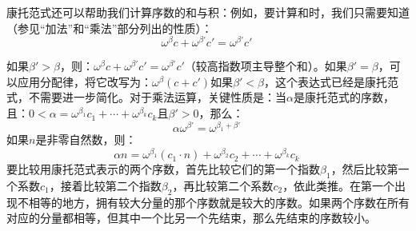康托范式还可以帮助我们计算序数的和与积：例如，要计算和时，我们只需要知道（参见“加法”和“乘法”部分列出的性质）：  
\[
\omega^\beta c + \omega^{\beta'} c' = \omega^{\beta'} c'~
\]

如果\(\beta' > \beta\)，则：\(\omega^\beta c + \omega^{\beta'} c' = \omega^{\beta'} c'\)（较高指数项主导整个和）。如果\(\beta' = \beta\)，可以应用分配律，将它改写为：\(\omega^\beta (c + c')\)如果\(\beta' < \beta\)，这个表达式已经是康托范式，不需要进一步简化。对于乘法运算，关键性质是：当\(\alpha\)是康托范式的序数，且：\(0 < \alpha = \omega^{\beta_1}c_1 + \cdots + \omega^{\beta_k}c_k\)且\(\beta' > 0\)，那么：
\[
\alpha\omega^{\beta'} = \omega^{\beta_1 + \beta'}~
\]
如果\(n\)是非零自然数，则：
\[
\alpha n = \omega^{\beta_1}(c_1 \cdot n) + \omega^{\beta_2}c_2 + \cdots + \omega^{\beta_k}c_k~
\]
要比较用康托范式表示的两个序数，首先比较它们的第一个指数\(\beta_1\)，然后比较第一个系数\(c_1\)，接着比较第二个指数\(\beta_2\)，再比较第二个系数\(c_2\)，依此类推。在第一个出现不相等的地方，拥有较大分量的那个序数就是较大的序数。如果两个序数在所有对应的分量都相等，但其中一个比另一个先结束，那么先结束的序数较小。

